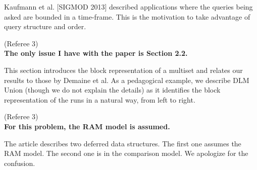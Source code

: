 \begin{appendices}
  Kaufmann et al. [SIGMOD 2013] described applications where the
  queries being asked are bounded in a time-frame. This is the
  motivation to take advantage of query structure and order.

  (Referee 3)~\\
  \textbf{The only issue I have with the paper is Section 2.2.}

  This section introduces the block representation of a multiset and
  relates our results to those by Demaine et al. As a pedagogical
  example, we describe DLM Union (though we do not explain the
  details) as it identifies the block representation of the runs in a
  natural way, from left to right.

  (Referee 3)~\\
  \textbf{For this problem, the RAM model is assumed.}

  The article describes two deferred data structures. The first one
  assumes the RAM model. The second one is in the comparison model. We
  apologize for the confusion.


\end{appendices}


